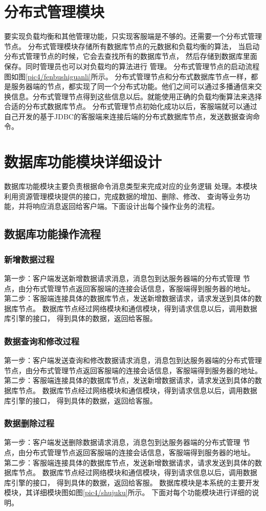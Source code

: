 \section{分布式管理模块}
要实现负载均衡和其他管理功能，只实现客服端是不够的。还需要一个分布式管理节点。
分布式管理模块存储所有数据库节点的元数据和负载均衡的算法，
当启动分布式管理节点的时候，它会去查找所有的数据库节点，
然后存储到数据库里面保存。同时管理员也可以对负载均的算法进行
管理。
分布式管理节点的启动流程图如图\ref{pic4/fenbushiguanli}所示。
分布式管理节点和分布式数据库节点一样，都是服务器端的节点，都实现了同一个分布式功能。他们之间可以通过多播通信来交换信息。分布式管理节点得到这些信息以后。就能使用正确的负载均衡算法来选择合适的分布式数据库节点。
分布式管理节点初始化成功以后，客服端就可以通过自己开发的基于JDBC的客服端来连接后端的分布式数据库节点，发送数据查询命令。
\section{数据库功能模块详细设计}
数据库功能模块主要负责根据命令消息类型来完成对应的业务逻辑
处理。本模块利用资源管理模块提供的接口，完成数据的增加、删除、修改、
查询等业务功能，并将响应消息返回给客户端。下面设计出每个操作业务的流程。
\subsection{数据库功能操作流程}
\subsubsection{新增数据过程}
第一步：客户端发送新增数据请求消息，消息包到达服务器端的分布式管理
节点，由分布式管理节点返回客服端的连接会话信息，客服端得到服务器的地址。
第二步：客服端连接具体的数据库节点，发送新增数据请求，请求发送到具体的数据库节点。
数据库节点经过网络模块和通信模块，得到请求信息以后，调用数据库引擎的接口，
得到具体的数据，返回给客服。
\subsubsection{数据查询和修改过程}
第一步：客户端发送查询和修改数据请求消息，消息包到达服务器端的分布式管理
节点，由分布式管理节点返回客服端的连接会话信息，客服端得到服务器的地址。
第二步：客服端连接具体的数据库节点，发送新增数据请求，请求发送到具体的数据库节点。
数据库节点经过网络模块和通信模块，得到请求信息以后，调用数据库引擎的接口，
得到具体的数据，返回给客服。
\subsubsection{数据删除过程}
第一步：客户端发送删除数据请求消息，消息包到达服务器端的分布式管理
节点，由分布式管理节点返回客服端的连接会话信息，客服端得到服务器的地址。
第二步：客服端连接具体的数据库节点，发送新增数据请求，请求发送到具体的数据库节点。
数据库节点经过网络模块和通信模块，得到请求信息以后，调用数据库引擎的接口，
得到具体的数据，返回给客服。
数据库模块是本系统的主要开发模块，其详细模块图如图\ref{pic4/shujuku}所示。
下面对每个功能模块进行详细的说明。
